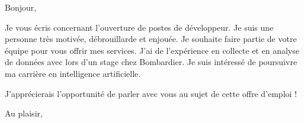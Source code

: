 \documentclass[12pt,french]{letter}
\begin{document}
\pagestyle{headings}

\begin{letter}{}
\address{Montréal, Canada}

\opening{Bonjour,}


Je vous écris concernant l'ouverture de postes de développeur.
Je suis une personne très motivée, débrouillarde et enjouée. Je souhaite faire partie de votre équipe pour vous offrir mes services. 
J'ai de l'expérience en collecte et en analyse de données avec lors d'un stage chez Bombardier.  Je suis intéressé de poursuivre ma carrière en intelligence artificielle.

J'apprécierais l'opportunité de parler avec vous au sujet de cette offre d'emploi !
\signature{Maxime}

\closing{Au plaisir,}


\end{letter}
\end{document}
